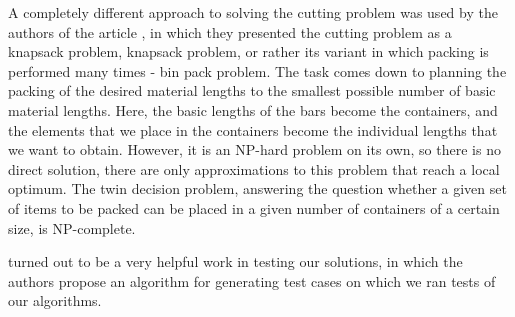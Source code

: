 A completely different approach to solving the cutting problem was used by the authors of the article \cite{bin-packing}, in which they presented the cutting problem as a knapsack problem, knapsack problem, or rather its variant in which packing is performed many times - bin pack problem. The task comes down to planning the packing of the desired material lengths to the smallest possible number of basic material lengths. Here, the basic lengths of the bars become the containers, and the elements that we place in the containers become the individual lengths that we want to obtain. However, it is an NP-hard problem on its own, so there is no direct solution, there are only approximations to this problem that reach a local optimum. The twin decision problem, answering the question whether a given set of items to be packed can be placed in a given number of containers of a certain size, is NP-complete.

\cite{problem-generator} turned out to be a very helpful work in testing our solutions, in which the authors propose an algorithm for generating test cases on which we ran tests of our algorithms.